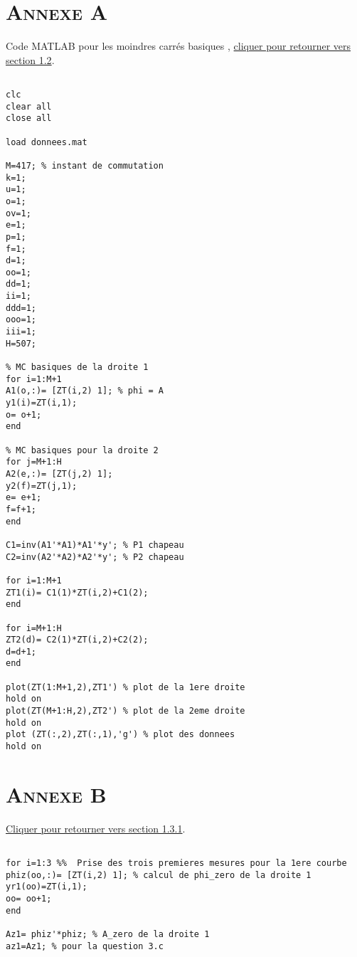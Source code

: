 \begin{appendices}
\chapter*{\textsc{Annexe A}}
	
	Code MATLAB pour les moindres carrés basiques ,\label{Annexe A} \hyperref[section 1.2]{cliquer pour retourner vers section 1.2}.

	\begin{lstlisting}	
	 
clc
clear all
close all

load donnees.mat

M=417; % instant de commutation
k=1;
u=1;
o=1;
ov=1;
e=1;
p=1;
f=1;
d=1;
oo=1;
dd=1;
ii=1;
ddd=1;
ooo=1;
iii=1;
H=507;

% MC basiques de la droite 1 
for i=1:M+1
A1(o,:)= [ZT(i,2) 1]; % phi = A
y1(i)=ZT(i,1);
o= o+1;
end

% MC basiques pour la droite 2
for j=M+1:H
A2(e,:)= [ZT(j,2) 1];
y2(f)=ZT(j,1);
e= e+1;
f=f+1;
end

C1=inv(A1'*A1)*A1'*y'; % P1 chapeau
C2=inv(A2'*A2)*A2'*y'; % P2 chapeau

for i=1:M+1
ZT1(i)= C1(1)*ZT(i,2)+C1(2);
end

for i=M+1:H
ZT2(d)= C2(1)*ZT(i,2)+C2(2);
d=d+1;
end

plot(ZT(1:M+1,2),ZT1') % plot de la 1ere droite
hold on
plot(ZT(M+1:H,2),ZT2') % plot de la 2eme droite
hold on
plot (ZT(:,2),ZT(:,1),'g') % plot des donnees
hold on

	\end{lstlisting}
	
	\chapter*{\textsc{Annexe B}}
	
	\label{Annexe B} \hyperref[section 1.3.1]{ Cliquer pour retourner vers section 1.3.1}.

	\begin{lstlisting}	
	 
for i=1:3 %%  Prise des trois premieres mesures pour la 1ere courbe 
phiz(oo,:)= [ZT(i,2) 1]; % calcul de phi_zero de la droite 1
yr1(oo)=ZT(i,1);
oo= oo+1;
end

Az1= phiz'*phiz; % A_zero de la droite 1
az1=Az1; % pour la question 3.c


\end{lstlisting}
\end{appendices}
